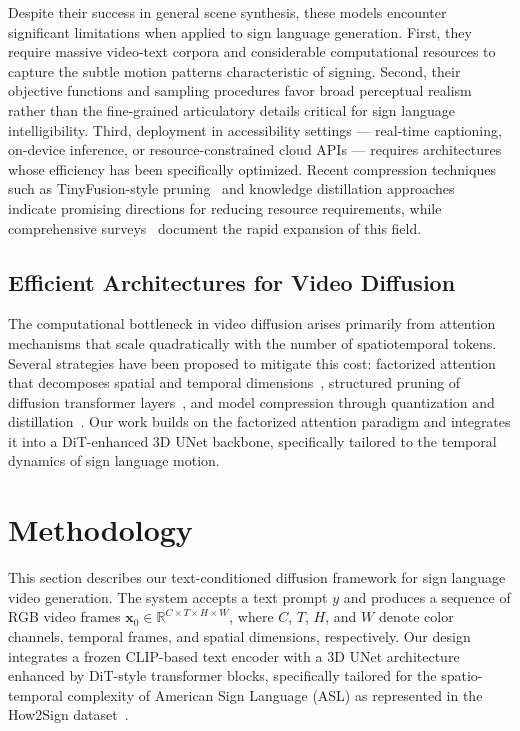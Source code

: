 \documentclass{ieeeaccess}
\begin{document}
Despite their success in general scene synthesis, these models encounter significant limitations when applied to sign language generation. First, they require massive video-text corpora and considerable computational resources to capture the subtle motion patterns characteristic of signing. Second, their objective functions and sampling procedures favor broad perceptual realism rather than the fine-grained articulatory details critical for sign language intelligibility. Third, deployment in accessibility settings — real-time captioning, on-device inference, or resource-constrained cloud APIs — requires architectures whose efficiency has been specifically optimized. Recent compression techniques such as TinyFusion-style pruning~\cite{fang2025tinyfusion} and knowledge distillation approaches~\cite{hinton2015distillation, sanh2020distilbert} indicate promising directions for reducing resource requirements, while comprehensive surveys~\cite{zhang2025videodiffusionsurvey, arxiv2025videosurvey} document the rapid expansion of this field.

\subsection{Efficient Architectures for Video Diffusion}

The computational bottleneck in video diffusion arises primarily from attention mechanisms that scale quadratically with the number of spatiotemporal tokens. Several strategies have been proposed to mitigate this cost: factorized attention that decomposes spatial and temporal dimensions~\cite{ho2022videodiffusion}, structured pruning of diffusion transformer layers~\cite{fang2025tinyfusion}, and model compression through quantization and distillation~\cite{han2016deepcompression}. Our work builds on the factorized attention paradigm and integrates it into a DiT-enhanced 3D UNet backbone, specifically tailored to the temporal dynamics of sign language motion.

\section{Methodology}
\label{sec:method}

This section describes our text-conditioned diffusion framework for sign language video generation. The system accepts a text prompt $y$ and produces a sequence of RGB video frames $\mathbf{x}_0 \in \mathbb{R}^{C \times T \times H \times W}$, where $C$, $T$, $H$, and $W$ denote color channels, temporal frames, and spatial dimensions, respectively. Our design integrates a frozen CLIP-based text encoder with a 3D UNet architecture enhanced by DiT-style transformer blocks, specifically tailored for the spatio-temporal complexity of American Sign Language (ASL) as represented in the How2Sign dataset~\cite{duarte2021how2sign}.
\end{document}
